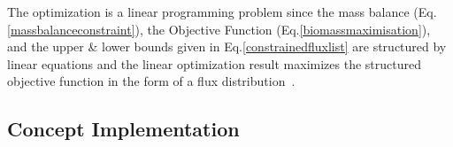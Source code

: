 

The optimization is a linear programming problem since the mass balance (Eq.\eqref{massbalanceconstraint}), the Objective Function (Eq.\eqref{biomassmaximisation}), and the upper \& lower bounds given in Eq.\eqref{constrainedfluxlist} are structured by linear equations and the linear optimization result maximizes the structured objective function in the form of a flux distribution~\cite{KAUFFMAN2003491,PRICE2004}.

\subsection{Concept Implementation}
